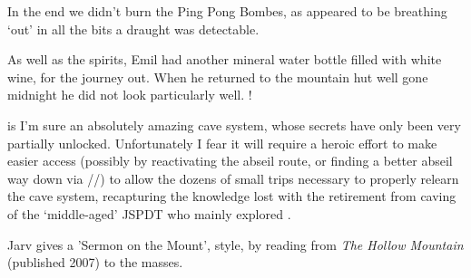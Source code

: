 In the end we didn't burn the Ping Pong Bombes, as 
appeared to be breathing `out' in all the bits a draught was detectable.

As well as the spirits, Emil had another mineral water bottle filled
with white wine, for the journey out. When he returned to the mountain
hut well gone midnight he did not look particularly well. !

 is I'm sure an absolutely amazing cave system, whose
secrets have only been very partially unlocked. Unfortunately I fear it
will require a heroic effort to make easier access (possibly by
reactivating the abseil route, or finding a better abseil way down via
//) to allow the dozens of small trips necessary to
properly relearn the cave system, recapturing the knowledge lost with
the retirement from caving of the `middle-aged' JSPDT who mainly
explored .



\begin{pagefigure}
      \checkoddpage \ifoddpage \forcerectofloat \else \forceversofloat \fi
      \centering
  \caption{Jarv gives a 'Sermon on the Mount',  style, by reading from \textit{The Hollow Mountain} (published 2007) to the masses. }
\end{pagefigure}


